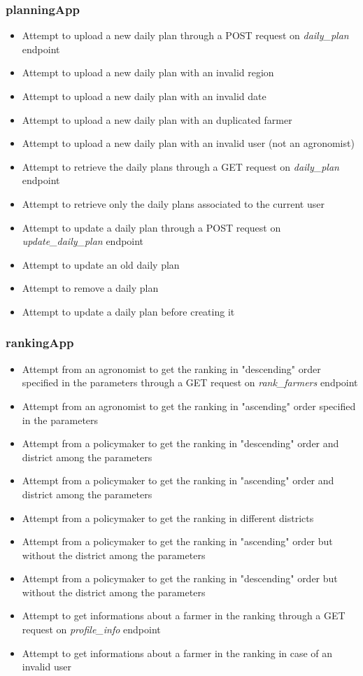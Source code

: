\documentclass[table, 12pt]{article}
\begin{document}
\subsubsection*{planningApp}
\begin{itemize}
    \item Attempt to upload a new daily plan through a POST request on \textit{daily\_plan} endpoint
    \item Attempt to upload a new daily plan with an invalid region
    \item Attempt to upload a new daily plan with an invalid date
    \item Attempt to upload a new daily plan with an duplicated farmer
    \item Attempt to upload a new daily plan with an invalid user (not an agronomist)
    \item Attempt to retrieve the daily plans through a GET request on \textit{daily\_plan} endpoint
    \item Attempt to retrieve only the daily plans associated to the current user
    \item Attempt to update a daily plan through a POST request on \textit{update\_daily\_plan} endpoint
    \item Attempt to update an old daily plan
    \item Attempt to remove a daily plan
    \item Attempt to update a daily plan before creating it
\end{itemize}
\subsubsection*{rankingApp}
\begin{itemize}
    \item Attempt from an agronomist to get the ranking in "descending" order specified in the parameters through a GET request on \textit{rank\_farmers} endpoint
    \item Attempt from an agronomist to get the ranking in "ascending" order specified in the parameters
    \item Attempt from a policymaker to get the ranking in "descending" order and district among the parameters
    \item Attempt from a policymaker to get the ranking in "ascending" order and district among the parameters
    \item Attempt from a policymaker to get the ranking in different districts
    \item Attempt from a policymaker to get the ranking in "ascending" order but without the district among the parameters
    \item Attempt from a policymaker to get the ranking in "descending" order but without the district among the parameters
    \item Attempt to get informations about a farmer in the ranking through a GET request on \textit{profile\_info} endpoint
    \item Attempt to get informations about a farmer in the ranking in case of an invalid user
\end{itemize}
\end{document}
